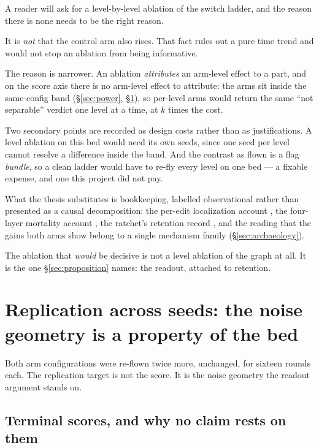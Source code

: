 A reader will ask for a level-by-level ablation of the switch ladder, and
the reason there is none needs to be the right reason.

It is \emph{not} that the control arm also rises. That fact rules out a
pure time trend and would not stop an ablation from being informative.

The reason is narrower. An ablation \emph{attributes} an arm-level effect
to a part, and on the score axis there is no arm-level effect to attribute:
the arms sit inside the same-config band (\S\ref{sec:power},
\S\ref{sec:replication}), so per-level arms would return the same ``not
separable'' verdict one level at a time, at $k$ times the cost.

Two secondary points are recorded as design costs rather than as
justifications. A level ablation on this bed would need its own seeds,
since one seed per level cannot resolve a difference inside the band. And
the contrast as flown is a flag \emph{bundle}, so a clean ladder would have
to re-fly every level on one bed --- a fixable expense, and one this
project did not pay.

What the thesis substitutes is bookkeeping, labelled  observational
rather than presented as a causal decomposition: the per-edit localization
account , the four-layer mortality account , the
ratchet's retention record , and the reading that the gains both arms
show belong to a single mechanism family (\S\ref{sec:archaeology}).

The ablation that \emph{would} be decisive is not a level ablation of the
graph at all. It is the one \S\ref{sec:proposition} names: the readout,
attached to retention.

\section{Replication across seeds: the noise geometry is a property of the
bed}
\label{sec:replication}

Both arm configurations were re-flown twice more, unchanged, for sixteen
rounds each. The replication target is not the score. It is the noise
geometry the readout argument stands on.

\subsection*{Terminal scores, and why no claim rests on them}

